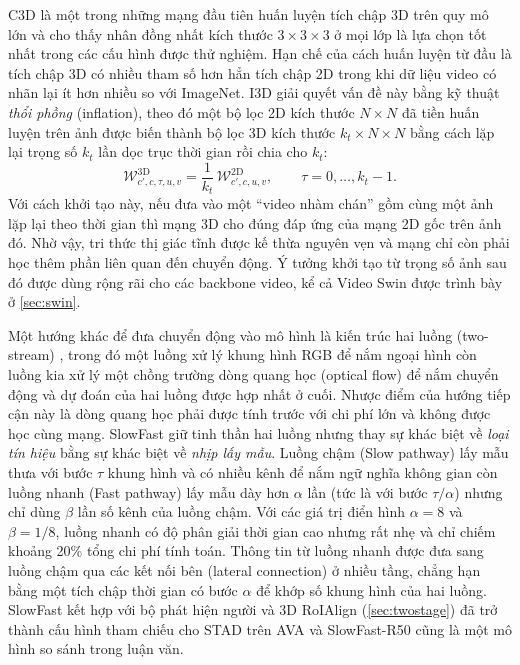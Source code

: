 C3D \cite{tran2015c3d} là một trong những mạng đầu tiên huấn luyện tích chập 3D trên quy mô lớn và cho thấy nhân đồng nhất kích thước $3 \times 3 \times 3$ ở mọi lớp là lựa chọn tốt nhất trong các cấu hình được thử nghiệm. Hạn chế của cách huấn luyện từ đầu là tích chập 3D có nhiều tham số hơn hẳn tích chập 2D trong khi dữ liệu video có nhãn lại ít hơn nhiều so với ImageNet. I3D \cite{carreira2017i3d} giải quyết vấn đề này bằng kỹ thuật \emph{thổi phồng} (inflation), theo đó một bộ lọc 2D kích thước $N \times N$ đã tiền huấn luyện trên ảnh được biến thành bộ lọc 3D kích thước $k_t \times N \times N$ bằng cách lặp lại trọng số $k_t$ lần dọc trục thời gian rồi chia cho $k_t$:
\begin{equation}
\mathcal{W}^{\text{3D}}_{c',c,\tau,u,v} = \frac{1}{k_t}\,\mathcal{W}^{\text{2D}}_{c',c,u,v}, \qquad \tau = 0, \dots, k_t - 1.
\label{eq:inflate}
\end{equation}
Với cách khởi tạo này, nếu đưa vào một ``video nhàm chán'' gồm cùng một ảnh lặp lại theo thời gian thì mạng 3D cho đúng đáp ứng của mạng 2D gốc trên ảnh đó. Nhờ vậy, tri thức thị giác tĩnh được kế thừa nguyên vẹn và mạng chỉ còn phải học thêm phần liên quan đến chuyển động. Ý tưởng khởi tạo từ trọng số ảnh sau đó được dùng rộng rãi cho các backbone video, kể cả Video Swin \cite{liu2022videoswin} được trình bày ở \cref{sec:swin}.

Một hướng khác để đưa chuyển động vào mô hình là kiến trúc hai luồng (two-stream) \cite{simonyan2014twostream}, trong đó một luồng xử lý khung hình RGB để nắm ngoại hình còn luồng kia xử lý một chồng trường dòng quang học (optical flow) để nắm chuyển động và dự đoán của hai luồng được hợp nhất ở cuối. Nhược điểm của hướng tiếp cận này là dòng quang học phải được tính trước với chi phí lớn và không được học cùng mạng. SlowFast \cite{feichtenhofer2019slowfast} giữ tinh thần hai luồng nhưng thay sự khác biệt về \emph{loại tín hiệu} bằng sự khác biệt về \emph{nhịp lấy mẫu}. Luồng chậm (Slow pathway) lấy mẫu thưa với bước $\tau$ khung hình và có nhiều kênh để nắm ngữ nghĩa không gian còn luồng nhanh (Fast pathway) lấy mẫu dày hơn $\alpha$ lần (tức là với bước $\tau/\alpha$) nhưng chỉ dùng $\beta$ lần số kênh của luồng chậm. Với các giá trị điển hình $\alpha = 8$ và $\beta = 1/8$, luồng nhanh có độ phân giải thời gian cao nhưng rất nhẹ và chỉ chiếm khoảng 20\% tổng chi phí tính toán. Thông tin từ luồng nhanh được đưa sang luồng chậm qua các kết nối bên (lateral connection) ở nhiều tầng, chẳng hạn bằng một tích chập thời gian có bước $\alpha$ để khớp số khung hình của hai luồng. SlowFast kết hợp với bộ phát hiện người và 3D RoIAlign (\cref{sec:twostage}) đã trở thành cấu hình tham chiếu cho STAD trên AVA và SlowFast-R50 cũng là một mô hình so sánh trong luận văn.

